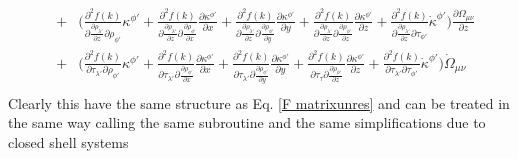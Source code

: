 \documentclass[preprint,preprintnumbers,amsmath,amssymb,11pt]{revtex4}
\begin{document}
\begin{eqnarray}
&+&\biggl( 
 \frac{\partial^{2} f(k)}{\partial \frac{\partial \rho_{\lambda'}}{\partial z} \partial \rho_{\phi'}}   \kappa^{\phi'}
+ \frac{\partial^{2} f(k)}{\partial \frac{\partial \rho_{\lambda'}}{\partial z} \partial \frac{\partial \rho_{\phi'}}{\partial x}}   \frac{\partial \kappa^{\phi'}}{\partial x} 
+ \frac{\partial^{2} f(k)}{\partial \frac{\partial \rho_{\lambda'}}{\partial z} \partial \frac{\partial \rho_{\phi'}}{\partial y}}   \frac{\partial \kappa^{\phi'}}{\partial y} 
+ \frac{\partial^{2} f(k)}{\partial \frac{\partial \rho_{\lambda'}}{\partial z} \partial \frac{\partial \rho_{\phi'}}{\partial z}} \frac{\partial \kappa^{\phi'}}{\partial z} 
+\frac{\partial^{2} f(k)}{\partial \frac{\partial \rho_{\lambda'}}{\partial z} \partial \tau_{\phi'}} \dot{\kappa}^{\phi'}
\biggr) \frac{\partial \Omega_{\mu \nu}}{\partial z} \nonumber\\
&+&
\biggl( 
\frac{\partial^{2} f(k)}{\partial \tau_{\lambda'} \partial \rho_{\phi'}} \kappa^{\phi'}
+\frac{\partial^{2} f(k)}{\partial \tau_{\lambda'} \partial \frac{\partial \rho_{\phi'}}{\partial x}}\frac{\partial \kappa^{\phi'}}{\partial x}
+\frac{\partial^{2} f(k)}{\partial \tau_{\lambda'} \partial \frac{\partial \rho_{\phi'}}{\partial y}} \frac{\partial \kappa^{\phi'}}{\partial y}
+\frac{\partial^{2} f(k)}{\partial \tau_{\tau} \partial \frac{\partial \rho_{\phi'}}{\partial z}}  \frac{\partial \kappa^{\phi'}}{\partial z}
+ \frac{\partial^{2} f(k)}{\partial \tau_{\lambda'} \partial \tau_{\phi'}} \dot{\kappa}^{\phi'}
\biggr) \dot{\Omega}_{\mu \nu}\nonumber\\
\end{eqnarray}
Clearly this have the same structure as Eq. \eqref{F matrixunres} and can be treated in the same way calling the same subroutine and the same simplifications due to closed shell systems
\end{document}

